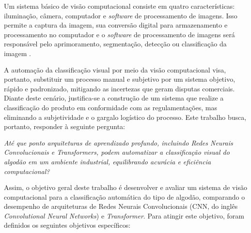 Um sistema básico de visão computacional consiste em quatro características: iluminação, câmera, computador e \textit{software} de processamento de imagens. Isso permite a captura da imagem, sua conversão digital para armazenamento e processamento no computador e o \textit{software} de processamento de imagens será responsável pelo aprimoramento, segmentação, detecção ou classificação da imagem \cite{zhang2014computer}.




A automação da classificação visual por meio da visão computacional visa, portanto, substituir um processo manual e subjetivo por um sistema objetivo, rápido e padronizado, mitigando as incertezas que geram disputas comerciais. Diante deste cenário, justifica-se a construção de um sistema que realize a classificação do produto em conformidade com as regulamentações, mas eliminando a subjetividade e o gargalo logístico do processo. Este trabalho busca, portanto, responder à seguinte pergunta:

\textit{Até que ponto arquiteturas de aprendizado profundo, incluindo Redes Neurais Convolucionais e Transformers, podem automatizar a classificação visual do algodão em um ambiente industrial, equilibrando acurácia e eficiência computacional?}

Assim, o objetivo geral deste trabalho é desenvolver e avaliar um sistema de visão computacional para a classificação automática do tipo de algodão, comparando o desempenho de arquiteturas de Redes Neurais Convolucionais (CNN, do inglês \textit{Convolutional Neural Networks}) e \textit{Transformer}. Para atingir este objetivo, foram definidos os seguintes objetivos específicos:

